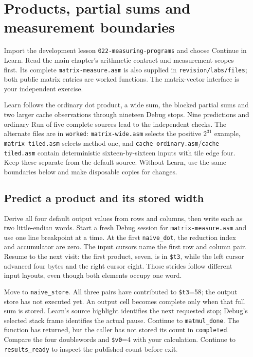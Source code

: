 \chapter{Products, partial sums and measurement boundaries}
\label{revision-lab:measurement}

Import the development lesson \texttt{022-measuring-programs} and choose Continue
in Learn. Read the main chapter's arithmetic contract and measurement scopes first.
Its complete \texttt{matrix-measure.asm} is also supplied in
\texttt{revision/labs/files}; both public matrix entries are worked functions.
The matrix-vector interface is your independent exercise.

Learn follows the ordinary dot product, a wide sum, the blocked partial sums and
two larger cache observations through nineteen Debug stops. Nine predictions and
ordinary Run of five complete sources lead to the independent checks. The
alternate files are in \texttt{worked}: \texttt{matrix-wide.asm} selects the
positive $2^{31}$ example, \texttt{matrix-tiled.asm} selects method one, and
\texttt{cache-ordinary.asm}/\texttt{cache-tiled.asm} contain deterministic
sixteen-by-sixteen inputs with tile edge four. Keep these separate from the default
source. Without Learn, use the same boundaries below and make disposable copies
for changes.

\section{Predict a product and its stored width}

Derive all four default output values from rows and columns, then write each as
two little-endian words. Start a fresh Debug session for \texttt{matrix-measure.asm}
and use one line breakpoint at a time. At the first \texttt{naive\_dot}, the
reduction index and accumulator are zero. The input cursors name the first row
and column pair. Resume to the next visit: the first product, seven, is in
\texttt{\$t3}, while the left cursor advanced four bytes and the right cursor
eight. Those strides follow different input layouts, even though both elements
occupy one word.

Move to \texttt{naive\_store}. All three pairs have contributed to
\texttt{\$t3}=58; the output store has not executed yet. An output cell becomes
complete only when that full sum is stored. Learn's source highlight identifies
the next requested stop; Debug's selected stack frame identifies the actual pause.
Continue to \texttt{matmul\_done}. The function has returned,
but the caller has not stored its count in \texttt{completed}. Compare the four
doublewords and \texttt{\$v0}=4 with your calculation. Continue to
\texttt{results\_ready} to inspect the published count before exit.

